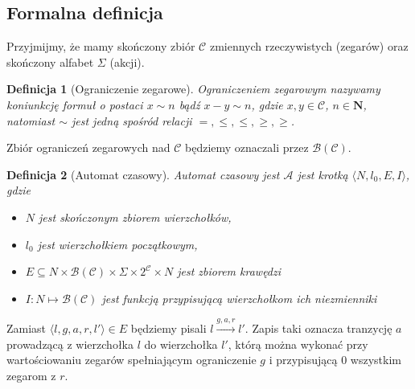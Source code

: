 \documentclass{pracamgr}
\theoremstyle{plain}
\newtheorem{definition}{Definicja}
\begin{document}
\subsection{Formalna definicja} Przyjmijmy, że mamy skończony zbiór
$\mathcal{C}$ zmiennych rzeczywistych (zegarów) oraz skończony alfabet
$\Sigma$ (akcji).

\begin{definition}[Ograniczenie zegarowe] Ograniczeniem zegarowym
nazywamy koniunkcję formuł o postaci $x \sim n$ bądź $x - y \sim n$,
gdzie $x, y \in \mathcal{C}$, $n \in \mathbf{N}$, natomiast $\sim$
jest jedną spośród relacji $=, \le, \leq, \ge, \geq$.
\end{definition}
Zbiór ograniczeń zegarowych nad $\mathcal{C}$ będziemy oznaczali przez
$\mathcal{B}(\mathcal{C})$.

\begin{definition}[Automat czasowy] Automat czasowy jest $\mathcal{A}$
jest krotką $\langle N, l_0, E, I\rangle$, gdzie
  \begin{itemize}
    \item $N$ jest skończonym zbiorem wierzchołków,
    \item $l_0$ jest wierzchołkiem początkowym,
    \item $E \subseteq N \times \mathcal{B}(\mathcal{C}) \times \Sigma
    \times 2^{\mathcal{C}} \times N$ jest zbiorem krawędzi
    \item $I: N \mapsto \mathcal{B}(\mathcal{C})$ jest funkcją
    przypisującą wierzchołkom ich niezmienniki
  \end{itemize}
\end{definition}
Zamiast $\langle l, g, a, r, l' \rangle \in E$ będziemy pisali $l
\stackrel{g, a, r}{\longrightarrow} l'$. Zapis taki oznacza tranzycję
$a$ prowadzącą z wierzchołka $l$ do wierzchołka $l'$, którą można
wykonać przy wartościowaniu zegarów spełniającym ograniczenie $g$ i
przypisującą $0$ wszystkim zegarom z $r$.
\end{document}
